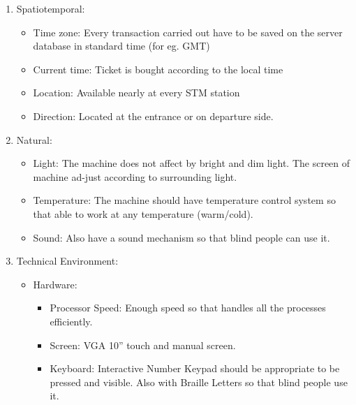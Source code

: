 \documentclass[11pt,oneside]{book}
\begin{document}
\begin{enumerate}
\begin{itemize}
        
 
        \end{itemize}
    
    \item Spatiotemporal:
        \begin{itemize}
     
\item Time zone: Every transaction carried out have to be saved on the server database in standard time (for eg. GMT)
\item Current time: Ticket is bought according to the local time 
\item Location: Available nearly at every STM station 
\item Direction: Located at the entrance or on departure side. 


 
        \end{itemize}
        
    \item Natural:
        \begin{itemize}
        
       \item Light: The machine does not affect by bright and dim light. The screen of machine ad-just according to surrounding light.
\item Temperature: The machine should have temperature control system so that able to work at any temperature (warm/cold).
\item Sound: Also have a sound mechanism so that blind people can use it. 


        
 
        \end{itemize}
        
         
  
    
    
    \item Technical Environment:
    
        \begin{itemize}
            
 \item Hardware:
 \begin{itemize}
 
\item Processor Speed: Enough speed so that handles all the processes efficiently.
\item Screen: VGA 10” touch and manual screen.
\item Keyboard: Interactive Number Keypad should be appropriate to be pressed and visible. Also with Braille Letters so that blind people use it.


\end{itemize}
\end{itemize}
\end{enumerate}
\end{document}
